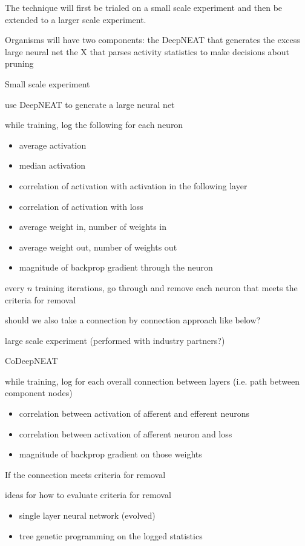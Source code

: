 The technique will first be trialed on a small scale experiment and then be extended to a larger scale experiment.

Organisms will have two components:
the DeepNEAT that generates the excess large neural net
the X that parses activity statistics to make decisions about pruning

Small scale experiment

use DeepNEAT to generate a large neural net

while training, log the following for each neuron
\begin{itemize}
\item average activation
\item median activation
\item correlation of activation with activation in the following layer
\item correlation of activation with loss
\item average weight in, number of weights in
\item average weight out, number of weights out
\item magnitude of backprop gradient through the neuron
\end{itemize}

every $n$ training iterations,
go through and remove each neuron that meets the criteria for removal

should we also take a connection by connection approach like below?

large scale experiment (performed with industry partners?)

CoDeepNEAT

while training, log for each overall connection between layers (i.e. path between component nodes)
\begin{itemize}
\item correlation between activation of afferent and efferent neurons
\item correlation between activation of afferent neuron and loss
\item magnitude of backprop gradient on those weights
\end{itemize}

If the connection meets criteria for removal

ideas for how to evaluate criteria for removal
\begin{itemize}
\item single layer neural network (evolved)
\item tree genetic programming on the logged statistics
\end{itemize}
